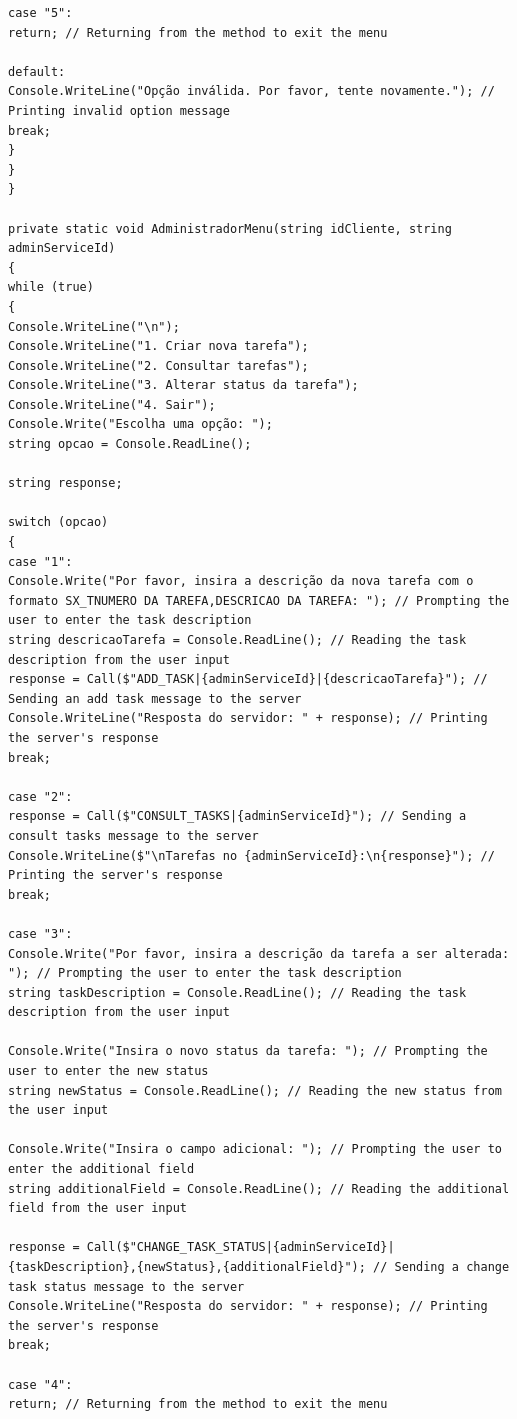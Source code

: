 \documentclass[12pt]{article}
\begin{document}
{\begin{verbatim}
case "5":
return; // Returning from the method to exit the menu

default:
Console.WriteLine("Opção inválida. Por favor, tente novamente."); // Printing invalid option message
break;
}
}
}

private static void AdministradorMenu(string idCliente, string adminServiceId)
{
while (true)
{
Console.WriteLine("\n");
Console.WriteLine("1. Criar nova tarefa");
Console.WriteLine("2. Consultar tarefas");
Console.WriteLine("3. Alterar status da tarefa");
Console.WriteLine("4. Sair");
Console.Write("Escolha uma opção: ");
string opcao = Console.ReadLine();

string response;

switch (opcao)
{
case "1":
Console.Write("Por favor, insira a descrição da nova tarefa com o formato SX_TNUMERO DA TAREFA,DESCRICAO DA TAREFA: "); // Prompting the user to enter the task description
string descricaoTarefa = Console.ReadLine(); // Reading the task description from the user input
response = Call($"ADD_TASK|{adminServiceId}|{descricaoTarefa}"); // Sending an add task message to the server
Console.WriteLine("Resposta do servidor: " + response); // Printing the server's response
break;

case "2":
response = Call($"CONSULT_TASKS|{adminServiceId}"); // Sending a consult tasks message to the server
Console.WriteLine($"\nTarefas no {adminServiceId}:\n{response}"); // Printing the server's response
break;

case "3":
Console.Write("Por favor, insira a descrição da tarefa a ser alterada: "); // Prompting the user to enter the task description
string taskDescription = Console.ReadLine(); // Reading the task description from the user input

Console.Write("Insira o novo status da tarefa: "); // Prompting the user to enter the new status
string newStatus = Console.ReadLine(); // Reading the new status from the user input

Console.Write("Insira o campo adicional: "); // Prompting the user to enter the additional field
string additionalField = Console.ReadLine(); // Reading the additional field from the user input

response = Call($"CHANGE_TASK_STATUS|{adminServiceId}|{taskDescription},{newStatus},{additionalField}"); // Sending a change task status message to the server
Console.WriteLine("Resposta do servidor: " + response); // Printing the server's response
break;

case "4":
return; // Returning from the method to exit the menu


\end{verbatim}}
\end{document}
